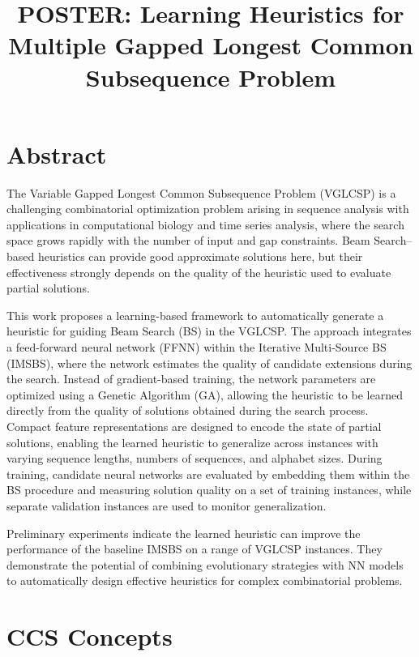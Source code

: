 \documentclass{sigplanconf}
\title{POSTER: Learning Heuristics for Multiple Gapped Longest Common Subsequence Problem}
\begin{document}
	
	\maketitle
	\vspace{-1cm}

	\section*{Abstract}
		 
 	The Variable Gapped Longest Common Subsequence Problem (VGLCSP) is a challenging combinatorial optimization problem arising in sequence analysis with applications in computational biology and time series analysis, where the search space grows rapidly with the number of input and gap constraints. Beam Search--based heuristics can provide good approximate solutions here, but their effectiveness strongly depends on the quality of the heuristic used to evaluate partial solutions.
 	
 	This work proposes a learning-based framework to automatically generate a heuristic for guiding Beam Search (BS) in the VGLCSP. The approach integrates a feed-forward neural network (FFNN) within the Iterative Multi-Source BS (IMSBS), where the network estimates the quality of candidate extensions during the search. Instead of gradient-based training, the network parameters are optimized using a Genetic Algorithm (GA), allowing the heuristic to be learned directly from the quality of solutions obtained during the search process. Compact feature representations are designed to encode the state of partial solutions, enabling the learned heuristic to generalize across instances with varying sequence lengths, numbers of sequences, and alphabet sizes. During training, candidate neural networks are evaluated by embedding them within the BS procedure and measuring solution quality on a set of training instances, while separate validation instances are used to monitor generalization.
 	
 	Preliminary experiments indicate the learned heuristic can improve the performance of the baseline IMSBS on a range of VGLCSP instances. They demonstrate the potential of combining evolutionary strategies with NN models to automatically design effective heuristics for complex combinatorial  problems.

	\section*{CCS Concepts}
	
\end{document}
